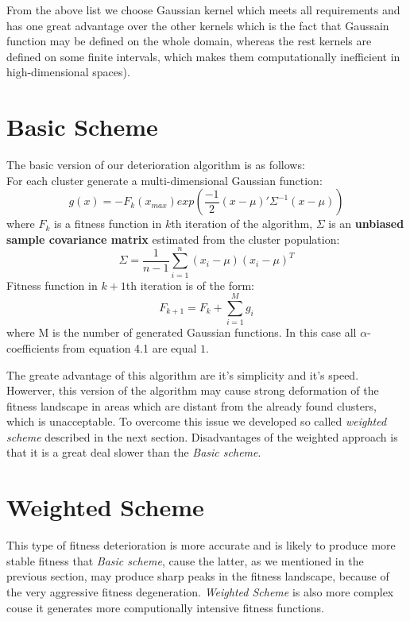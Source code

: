 From the above list we choose Gaussian kernel which meets all requirements and 
has one great advantage over the other kernels which is the fact that
Gaussain function may be defined on the whole domain, whereas the rest
kernels are defined on some finite intervals, which makes them computationally
inefficient in high-dimensional spaces).

\section{Basic Scheme}

The basic version of our deterioration algorithm is as follows: \\
For each cluster generate a multi-dimensional Gaussian function:
\begin{equation}
 g(x)= - F_k(x_{max}) exp(\frac{-1}{2}(x-\mu)'\Sigma^{-1}(x - \mu))
\end{equation}
where $F_k$ is a fitness function in $k$th iteration of the algorithm,
$\Sigma$ is an \textbf{unbiased sample covariance matrix} \cite{covariance}
estimated from the cluster population:
\begin{equation}
 \Sigma = \frac{1}{n-1}\sum_{i=1}^n(x_i - \mu)(x_i - \mu)^T
\end{equation}
Fitness function in $k+1$th iteration is of the form:
\begin{equation}
 F_{k+1}=F_k + \sum_{i=1}^M g_i
\end{equation}
where M is the number of generated Gaussian functions. In this case all
$\alpha$-coefficients from equation 4.1 are equal $1$.

The greate advantage of this algorithm are it's simplicity and it's speed.
Howerver, this version of the algorithm may cause strong deformation of the
fitness landscape in areas which are distant from the already found clusters,
which is unacceptable. To overcome this issue we
developed so called \textit{weighted scheme} described in the next section.
Disadvantages of the weighted approach is that it is a great deal slower
than the \textit{Basic scheme}. 

\section{Weighted Scheme}

This type of fitness deterioration is more accurate and is likely to produce
more stable fitness that \textit{Basic scheme}, cause the latter, as we
mentioned in the previous section, may produce sharp peaks in the fitness
landscape, because of the very aggressive fitness degeneration.
\textit{Weighted Scheme} is also more complex couse it generates
more computionally intensive fitness functions.

